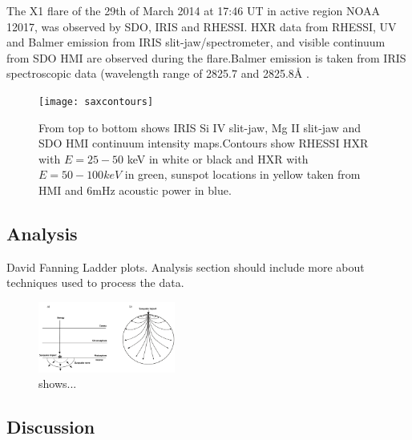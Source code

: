 The X1 flare of the 29th of March 2014 at 17:46 UT in active region NOAA 12017, was observed by SDO, IRIS and RHESSI. HXR data from RHESSI, UV and Balmer emission from IRIS slit-jaw/spectrometer, and visible continuum from SDO HMI are observed during the flare.Balmer emission is taken from IRIS spectroscopic data (wavelength range of 2825.7 and 2825.8Å \citep{2014ApJ...794L..23H}. \\

\begin{figure}\label{saxcontours}
  \begin{center}
  \texttt{[image: saxcontours]}
  \end{center}
  \caption{From top to bottom shows IRIS Si IV slit-jaw, Mg II slit-jaw and SDO HMI continuum intensity maps.Contours show RHESSI HXR with $E = 25-50$ keV in white or black and HXR with $E = 50-100 keV$ in green, sunspot locations in yellow taken from HMI and 6mHz acoustic power in blue.}
\end{figure}





















\subsection{Analysis}
David Fanning Ladder plots. Analysis section should include more about techniques used to process the data.

\begin{figure}\label{sunquake-cartoon}
  \begin{center}
  \includegraphics[width=0.40\textwidth]{sunquake-cartoon}
  \end{center}
  \caption{shows...}
\end{figure}


\subsection{Discussion}





